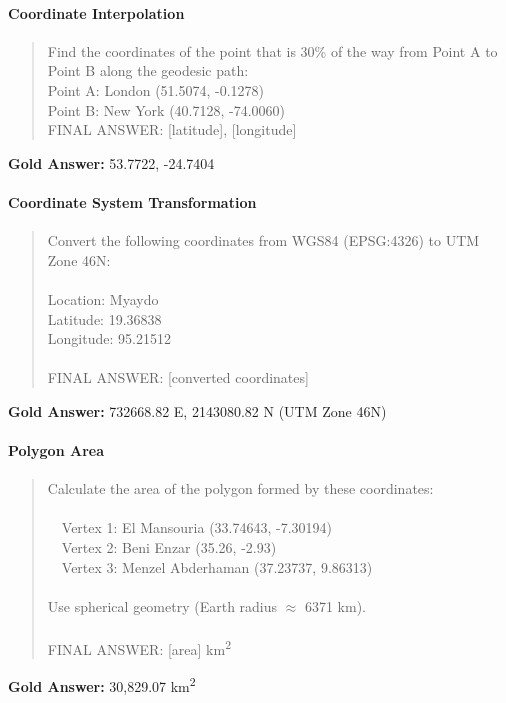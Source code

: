 \paragraph{Coordinate Interpolation}
\begin{quote}\ttfamily\small
Find the coordinates of the point that is 30\% of the way from Point A to Point B along the geodesic path:\\
Point A: London (51.5074, -0.1278)\\
Point B: New York (40.7128, -74.0060)\\
FINAL ANSWER: [latitude], [longitude]
\end{quote}
\textbf{Gold Answer:} 53.7722, -24.7404

\paragraph{Coordinate System Transformation}
\begin{quote}\ttfamily\small
Convert the following coordinates from WGS84 (EPSG:4326) to UTM Zone 46N:\\
\\
Location: Myaydo\\
Latitude: 19.36838\\
Longitude: 95.21512\\
\\
FINAL ANSWER: [converted coordinates]
\end{quote}
\textbf{Gold Answer:} 732668.82 E, 2143080.82 N (UTM Zone 46N)

\paragraph{Polygon Area}
\begin{quote}\ttfamily\small
Calculate the area of the polygon formed by these coordinates:\\
\\
~~Vertex 1: El Mansouria (33.74643, -7.30194)\\
~~Vertex 2: Beni Enzar (35.26, -2.93)\\
~~Vertex 3: Menzel Abderhaman (37.23737, 9.86313)\\
\\
Use spherical geometry (Earth radius $\approx$ 6371 km).\\
\\
FINAL ANSWER: [area] km\textsuperscript{2}
\end{quote}
\textbf{Gold Answer:} 30,829.07 km\textsuperscript{2}

